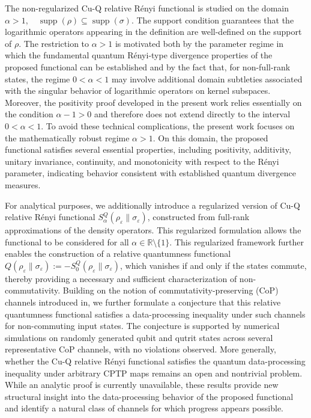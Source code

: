\documentclass[a4paper, amsfonts, amssymb, amsmath, reprint, showkeys, nofootinbib, twoside, aps, pra]{revtex4-2}
\theoremstyle{definition}
\begin{document}
The non-regularized Cu-Q relative Rényi functional is studied on the domain $\alpha>1,\quad \operatorname{supp}(\rho)\subseteq\operatorname{supp}(\sigma)$. The support condition guarantees that the logarithmic operators appearing in the definition are well-defined on the support of $\rho$. The restriction to $\alpha>1$ is motivated both by the parameter regime in which the fundamental quantum Rényi-type divergence properties of the proposed functional can be established and by the fact that, for non-full-rank states, the regime $0<\alpha<1$ may involve additional domain subtleties associated with the singular behavior of logarithmic operators on kernel subspaces. Moreover, the positivity proof developed in the present work relies essentially on the condition $\alpha-1>0$ and therefore does not extend directly to the interval $0<\alpha<1$. To avoid these technical complications, the present work focuses on the mathematically robust regime $\alpha>1$. On this domain, the proposed functional satisfies several essential properties, including positivity, additivity, unitary invariance, continuity, and monotonicity with respect to the Rényi parameter, indicating behavior consistent with established quantum divergence measures.
 

For analytical purposes, we additionally introduce a regularized version of Cu-Q relative Rényi functional
$S_{\alpha}^{Q}(\rho_\varepsilon\|\sigma_\varepsilon)$,
constructed from full-rank approximations of the density operators. This regularized formulation allows the functional to be considered for all $\alpha\in\mathbb{R}\setminus\{1\}$. This regularized framework further enables the construction of a relative quantumness functional $Q(\rho_\varepsilon\|\sigma_\varepsilon):=- S_0^Q(\rho_\varepsilon\|\sigma_\varepsilon)$, which vanishes if and only if the states commute, thereby providing a necessary and sufficient characterization of non-commutativity. Building on the notion of commutativity-preserving (CoP) channels introduced in\cite{Yu2011}, we further formulate a conjecture that this relative quantumness functional satisfies a data-processing inequality under such channels for non-commuting input states. The conjecture is supported by numerical simulations on randomly generated qubit and qutrit states across several representative CoP channels, with no violations observed. More generally, whether the Cu-Q relative Rényi functional satisfies the quantum data-processing inequality under arbitrary CPTP maps remains an open and nontrivial problem. While an analytic proof is currently unavailable, these results provide new structural insight into the data-processing behavior of the proposed functional and identify a natural class of channels for which progress appears possible.
\end{document}
